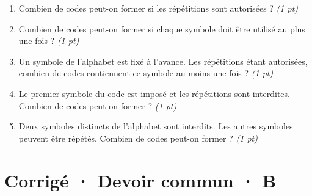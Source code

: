 \begin{enumerate}

\item Combien de codes peut-on former si les répétitions sont autorisées ? \hfill\textit{(1 pt)}

\item Combien de codes peut-on former si chaque symbole doit être utilisé au plus une fois ? \hfill\textit{(1 pt)}

\item Un symbole de l'alphabet est fixé à l'avance. Les répétitions étant autorisées, combien de codes contiennent ce symbole au moins une fois ? \hfill\textit{(1 pt)}

\item Le premier symbole du code est imposé et les répétitions sont interdites. Combien de codes peut-on former ? \hfill\textit{(1 pt)}

\item Deux symboles distincts de l'alphabet sont interdits. Les autres symboles peuvent être répétés. Combien de codes peut-on former ? \hfill\textit{(1 pt)}

\end{enumerate}

\ifprof\clearpage

\section*{Corrigé · Devoir commun · B}\label{cor:3-4}

